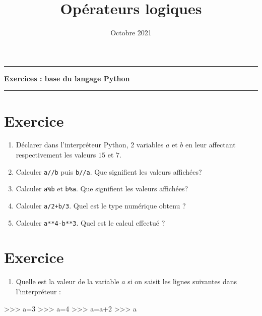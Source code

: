 \documentclass[11pt]{article}
\title{Opérateurs logiques}
\date{Octobre 2021}
\makeatletter
\providecommand{\tightlist}{%
      \setlength{\itemsep}{0pt}\setlength{\parskip}{0pt}}
\newenvironment{Shaded}{}{}
\newcommand{\DecValTok}[1]{\textcolor[rgb]{0.25,0.63,0.44}{{#1}}}
\newcommand{\NormalTok}[1]{{#1}}
\newcommand{\OperatorTok}[1]{\textcolor[rgb]{0.40,0.40,0.40}{{#1}}}
\renewcommand\maketitle[1]{
\hrule\medskip
{\raggedright %
\begin{center}
{\Huge \bfseries \sffamily #1 }\\[4ex] 
\hrule \bigskip
\end{center}}} %
\makeatother
\begin{document}
    
    \maketitle{Exercices : base du langage Python}
    
    
%
%    


    \hypertarget{exercice}{%
\section{Exercice}\label{exercice}}

\begin{enumerate}
\def\labelenumi{\arabic{enumi}.}
\tightlist
\item
  Déclarer dans l'interpréteur Python, 2 variables \(a\) et \(b\) en
  leur affectant respectivement les valeurs \(15\) et \(7\).
\item
  Calculer \texttt{a//b} puis \texttt{b//a}. Que signifient les valeurs
  affichées?
\item
  Calculer \texttt{a\%b} et \texttt{b\%a}. Que signifient les valeurs
  affichées?
\item
  Calculer \texttt{a/2+b/3}. Quel est le type numérique obtenu ?
\item
  Calculer \texttt{a**4-b**3}. Quel est le calcul effectué ?
\end{enumerate}

    \hypertarget{exercice}{%
\section{Exercice}\label{exercice}}

\begin{enumerate}
\def\labelenumi{\arabic{enumi}.}
\tightlist
\item
  Quelle est la valeur de la variable \(a\) si on saisit les lignes
  suivantes dans l'interpréteur :
\end{enumerate}

\begin{Shaded}
\begin{Highlighting}[]
\OperatorTok{\textgreater{}\textgreater{}\textgreater{}}\NormalTok{ a}\OperatorTok{=}\DecValTok{3}
\OperatorTok{\textgreater{}\textgreater{}\textgreater{}}\NormalTok{ a}\OperatorTok{=}\DecValTok{4}    
\OperatorTok{\textgreater{}\textgreater{}\textgreater{}}\NormalTok{ a}\OperatorTok{=}\NormalTok{a}\OperatorTok{+}\DecValTok{2}    
\OperatorTok{\textgreater{}\textgreater{}\textgreater{}}\NormalTok{ a     }
\end{Highlighting}
\end{Shaded}
\end{document}
